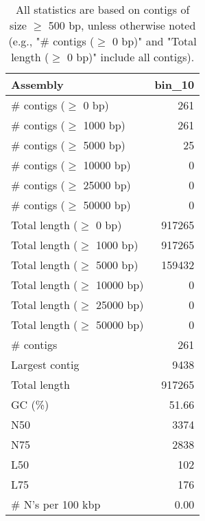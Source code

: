 \documentclass[12pt,a4paper]{article}
\begin{document}
\begin{table}[ht]
\begin{center}
\caption{All statistics are based on contigs of size $\geq$ 500 bp, unless otherwise noted (e.g., "\# contigs ($\geq$ 0 bp)" and "Total length ($\geq$ 0 bp)" include all contigs).}
\begin{tabular}{|l*{1}{|r}|}
\hline
Assembly & bin\_10 \\ \hline
\# contigs ($\geq$ 0 bp) & 261 \\ \hline
\# contigs ($\geq$ 1000 bp) & 261 \\ \hline
\# contigs ($\geq$ 5000 bp) & 25 \\ \hline
\# contigs ($\geq$ 10000 bp) & 0 \\ \hline
\# contigs ($\geq$ 25000 bp) & 0 \\ \hline
\# contigs ($\geq$ 50000 bp) & 0 \\ \hline
Total length ($\geq$ 0 bp) & 917265 \\ \hline
Total length ($\geq$ 1000 bp) & 917265 \\ \hline
Total length ($\geq$ 5000 bp) & 159432 \\ \hline
Total length ($\geq$ 10000 bp) & 0 \\ \hline
Total length ($\geq$ 25000 bp) & 0 \\ \hline
Total length ($\geq$ 50000 bp) & 0 \\ \hline
\# contigs & 261 \\ \hline
Largest contig & 9438 \\ \hline
Total length & 917265 \\ \hline
GC (\%) & 51.66 \\ \hline
N50 & 3374 \\ \hline
N75 & 2838 \\ \hline
L50 & 102 \\ \hline
L75 & 176 \\ \hline
\# N's per 100 kbp & 0.00 \\ \hline
\end{tabular}
\end{center}
\end{table}
\end{document}
